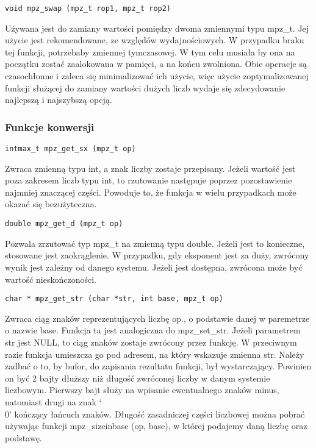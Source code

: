 \documentclass[twoside,a4paper]{book}
\begin{document}
\begin{lstlisting}
void mpz_swap (mpz_t rop1, mpz_t rop2)
\end{lstlisting}

Używana jest do zamiany wartości pomiędzy dwoma zmiennymi typu mpz\_t. Jej użycie jest rekomendowane, ze względów wydajnościowych. W przypadku braku tej funkcji, potrzebaby zmiennej tymczasowej. W tym celu musiała by ona na początku zostać zaalokowana w pamięci, a na końcu zwolniona. Obie operacje są czasochłonne i zaleca się minimalizować ich użycie, więc użycie zoptymalizowanej funkcji służącej do zamiany wartości dużych liczb wydaje się zdecydowanie najlepszą i najszybszą opcją.

\subsubsection{Funkcje konwersji}

\begin{lstlisting}
intmax_t mpz_get_sx (mpz_t op)
\end{lstlisting}

Zwraca zmienną typu int, a znak liczby zostaje przepisany. Jeżeli wartość jest poza zakresem liczb typu int, to rzutowanie następuje poprzez pozostawienie najmniej znaczącej części. Powoduje to, że funkcja w wielu przypadkach może okazać się bezużyteczna.

\begin{lstlisting}
double mpz_get_d (mpz_t op)
\end{lstlisting}

Pozwala zrzutować typ mpz\_t na zmienną typu double. Jeżeli jest to konieczne, stosowane jest zaokrąglenie. W przypadku, gdy eksponent jest za duży, zwrócony wynik jest zależny od danego systemu. Jeżeli jest dostępna, zwrócona może być wartość nieskończoności.

\begin{lstlisting}
char * mpz_get_str (char *str, int base, mpz_t op)
\end{lstlisting}

Zwraca ciąg znaków reprezentujących liczbę op., o podstawie danej w paremetrze o nazwie base. Funkcja ta jest analogiczna do mpz\_set\_str. Jeżeli parametrem str jest NULL, to ciąg znaków zostaje zwrócony przez funkcję. W przeciwnym razie funkcja umieszcza go pod adresem, na który wskazuje zmienna str. Należy zadbać o to, by bufor, do zapisania rezultatu funkcji, był wystarczający. Powinien on być 2 bajty dłuższy niż długość zwróconej liczby w danym systemie liczbowym. Pierwszy bajt służy na wpisanie ewentualnego znaków minus, natomiast drugi na znak ‘\\0’ kończący łańcuch znaków. Długość zasadniczej części liczbowej można pobrać używając funkcji mpz\_sizeinbase (op, base), w której podajemy daną liczbę oraz podstawę.
\end{document}

